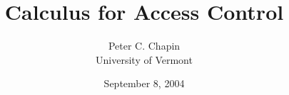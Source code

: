 \documentclass[landscape]{slides}
\begin{document}
\title{Calculus for Access Control}
\author{Peter C. Chapin\\University of Vermont}
\date{September 8, 2004}
\maketitle


\end{document}
